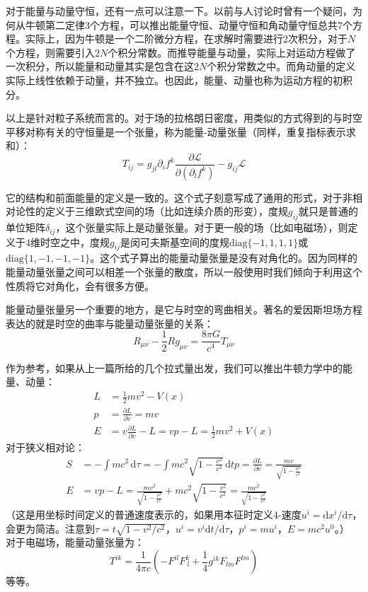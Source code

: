 \documentclass{ctexart}
\begin{document}
对于能量与动量守恒，还有一点可以注意一下。以前与人讨论时曾有一个疑问，为何从牛顿第二定律3个方程，可以推出能量守恒、动量守恒和角动量守恒总共7个方程。实际上，因为牛顿是一个二阶微分方程，在求解时需要进行2次积分，对于$N$个方程，则需要引入$2N$个积分常数。而推导能量与动量，实际上对运动方程做了一次积分，所以能量和动量其实是包含在这$2N$个积分常数之中。而角动量的定义实际上线性依赖于动量，并不独立。也因此，能量、动量也称为运动方程的初积分。

以上是针对粒子系统而言的。对于场的拉格朗日密度，用类似的方式得到的与时空平移对称有关的守恒量是一个张量，称为能量-动量张量（同样，重复指标表示求和）：
\begin{equation}
T_{ij}=g_{jl}\partial_if^k\frac{\partial\mathcal{L}}{\partial(\partial_lf^k)}-g_{ij}\mathcal{L}
\end{equation}

它的结构和前面能量的定义是一致的。这个式子刻意写成了通用的形式，对于非相对论性的定义于三维欧式空间的场（比如连续介质的形变），度规$g_{ij}$就只是普通的单位矩阵$\delta_{ij}$，这个张量实际上是动量张量。对于更一般的场（比如电磁场），则定义于4维时空之中，度规$g_{ij}$是闵可夫斯基空间的度规$\mathrm{diag}\{-1,1,1,1\}$或$\mathrm{diag}\{1,-1,-1,-1\}$。这个式子算出的能量动量张量是没有对角化的。因为同样的能量动量张量之间可以相差一个张量的散度，所以一般使用时我们倾向于利用这个性质将它对角化，会有很多方便。

能量动量张量另一个重要的地方，是它与时空的弯曲相关。著名的爱因斯坦场方程表达的就是时空的曲率与能量动量张量的关系：
\begin{equation}
R_{\mu\nu}-\frac{1}{2}Rg_{\mu\nu}=\frac{8\pi G}{c^4}T_{\mu\nu}
\end{equation}

作为参考，如果从上一篇所给的几个拉式量出发，我们可以推出牛顿力学中的能量、动量：
\begin{align}
L&=\frac{1}{2}mv^2-V(x)\\
p&=\frac{\partial L}{\partial v}=mv\\
E&=v\frac{\partial L}{\partial v}-L=vp-L=\frac{1}{2}mv^2+V(x)
\end{align}
对于狭义相对论：
\begin{align}
S&=-\int mc^2\,\mathrm{d}\tau=-\int mc^2\sqrt{1-\frac{v^2}{c^2}}\,\mathrm{d}tp=\frac{\partial L}{\partial v}=\frac{mv}{\sqrt{1-\frac{v^2}{c^2}}}\\
E&=vp-L=\frac{mv^2}{\sqrt{1-\frac{v^2}{c^2}}}+mc^2\sqrt{1-\frac{v^2}{c^2}}=\frac{mc^2}{\sqrt{1-\frac{v^2}{c^2}}}
\end{align}
（这是用坐标时间定义的普通速度表示的，如果用本征时定义4-速度$u^i=\mathrm{d}x^i/\mathrm{d}\tau$，会更为简洁。注意到$\tau=t\sqrt{1-v^2/c^2}$，$u^i=v^i\mathrm{d}t/\mathrm{d}\tau，p^i=mu^i$，$E=mc^2u^0$。）
对于电磁场，能量动量张量为：
\begin{equation}
T^{ik}=\frac{1}{4\pi c}(-F^{il}F^k_{\ l}+\frac{1}{4}g^{ik}F_{lm}F^{lm})
\end{equation}
等等。
\end{document}

